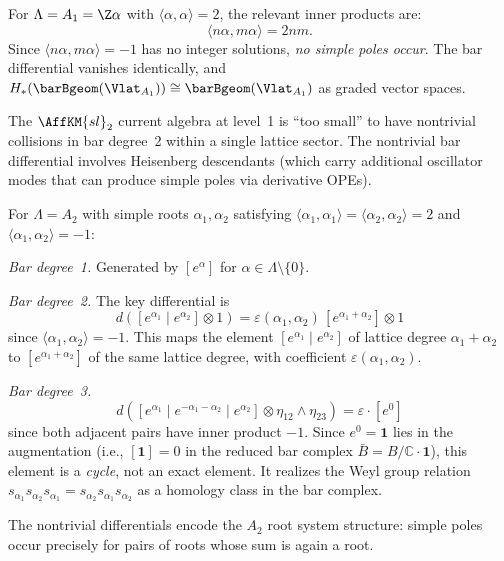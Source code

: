 \begin{computation}\label{comp:lattice:bar-A1}
For $\Lambda = A_1 = \Z\alpha$ with $\langle\alpha,\alpha\rangle = 2$,
the relevant inner products are:
\[
\langle n\alpha, m\alpha \rangle = 2nm.
\]
Since $\langle n\alpha, m\alpha\rangle = -1$ has no integer solutions,
\emph{no simple poles occur}. The bar differential vanishes identically,
and $H_*(\barBgeom(\Vlat_{A_1})) \cong \barBgeom(\Vlat_{A_1})$ as
graded vector spaces.

The $\AffKM{sl}_2$ current algebra at
level~1 is ``too small'' to have nontrivial collisions in bar degree~2
within a single lattice sector. The nontrivial bar differential involves
Heisenberg descendants (which carry additional oscillator modes that can
produce simple poles via derivative OPEs).
\end{computation}

\begin{computation}\label{comp:lattice:bar-A2}
For $\Lambda = A_2$ with simple roots $\alpha_1, \alpha_2$ satisfying
$\langle\alpha_1,\alpha_1\rangle = \langle\alpha_2,\alpha_2\rangle = 2$
and $\langle\alpha_1,\alpha_2\rangle = -1$:

\emph{Bar degree~1.} Generated by $[e^\alpha]$ for
$\alpha \in \Lambda \setminus \{0\}$.

\emph{Bar degree~2.} The key differential is
\[
d([e^{\alpha_1} \mid e^{\alpha_2}] \otimes 1)
= \varepsilon(\alpha_1,\alpha_2)\,[e^{\alpha_1+\alpha_2}] \otimes 1
\]
since $\langle\alpha_1,\alpha_2\rangle = -1$. This maps the element
$[e^{\alpha_1} \mid e^{\alpha_2}]$ of lattice degree
$\alpha_1 + \alpha_2$ to $[e^{\alpha_1+\alpha_2}]$ of the same lattice
degree, with coefficient $\varepsilon(\alpha_1,\alpha_2)$.

\emph{Bar degree~3.}
\[
d([e^{\alpha_1} \mid e^{-\alpha_1-\alpha_2} \mid e^{\alpha_2}]
\otimes \eta_{12} \wedge \eta_{23})
= \varepsilon \cdot [e^0]
\]
since both adjacent pairs have inner product $-1$. Since $e^0 = \mathbf{1}$ lies in the augmentation (i.e., $[\mathbf{1}] = 0$ in the reduced bar complex $\bar{B} = B/\mathbb{C}\cdot\mathbf{1}$), this element is a \emph{cycle}, not an exact element. It realizes the Weyl group relation $s_{\alpha_1} s_{\alpha_2} s_{\alpha_1} = s_{\alpha_2} s_{\alpha_1} s_{\alpha_2}$ as a homology class in the bar complex.

The nontrivial differentials encode the $A_2$ root system structure:
simple poles occur precisely for pairs of roots whose sum is again a root.
\end{computation}

